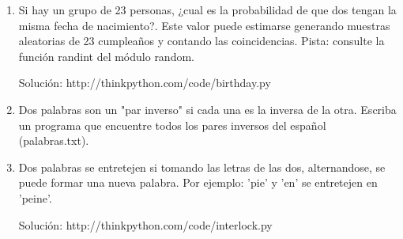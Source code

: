 \begin{enumerate}
  \item Si hay un grupo de 23 personas, ¿cual es la probabilidad de que dos tengan la misma fecha
  de nacimiento?. Este valor puede estimarse generando muestras aleatorias de 23 cumpleaños y 
  contando las coincidencias. Pista: consulte la función randint del módulo random.
  
  Solución: 
  http://thinkpython.com/code/birthday.py
  
  \item Dos palabras son un "par inverso" si cada una es la inversa de la otra. Escriba un programa
  que encuentre todos los pares inversos del español (palabras.txt).
  
  \item Dos palabras se entretejen si tomando las letras de las dos, alternandose, se puede formar
  una nueva palabra. Por ejemplo: 'pie' y 'en' se entretejen en 'peine'.
  
  Solución: http://thinkpython.com/code/interlock.py
\end{enumerate}
